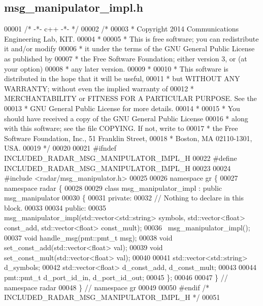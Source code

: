 \subsection{msg\+\_\+manipulator\+\_\+impl.\+h}
\label{msg__manipulator__impl_8h_source}

\begin{DoxyCode}
00001 \textcolor{comment}{/* -*- c++ -*- */}
00002 \textcolor{comment}{/* }
00003 \textcolor{comment}{ * Copyright 2014 Communications Engineering Lab, KIT.}
00004 \textcolor{comment}{ * }
00005 \textcolor{comment}{ * This is free software; you can redistribute it and/or modify}
00006 \textcolor{comment}{ * it under the terms of the GNU General Public License as published by}
00007 \textcolor{comment}{ * the Free Software Foundation; either version 3, or (at your option)}
00008 \textcolor{comment}{ * any later version.}
00009 \textcolor{comment}{ * }
00010 \textcolor{comment}{ * This software is distributed in the hope that it will be useful,}
00011 \textcolor{comment}{ * but WITHOUT ANY WARRANTY; without even the implied warranty of}
00012 \textcolor{comment}{ * MERCHANTABILITY or FITNESS FOR A PARTICULAR PURPOSE.  See the}
00013 \textcolor{comment}{ * GNU General Public License for more details.}
00014 \textcolor{comment}{ * }
00015 \textcolor{comment}{ * You should have received a copy of the GNU General Public License}
00016 \textcolor{comment}{ * along with this software; see the file COPYING.  If not, write to}
00017 \textcolor{comment}{ * the Free Software Foundation, Inc., 51 Franklin Street,}
00018 \textcolor{comment}{ * Boston, MA 02110-1301, USA.}
00019 \textcolor{comment}{ */}
00020 
00021 \textcolor{preprocessor}{#ifndef INCLUDED\_RADAR\_MSG\_MANIPULATOR\_IMPL\_H}
00022 \textcolor{preprocessor}{#define INCLUDED\_RADAR\_MSG\_MANIPULATOR\_IMPL\_H}
00023 
00024 \textcolor{preprocessor}{#include <radar/msg_manipulator.h>}
00025 
00026 \textcolor{keyword}{namespace }gr \{
00027   \textcolor{keyword}{namespace }radar \{
00028 
00029     \textcolor{keyword}{class }msg_manipulator_impl : \textcolor{keyword}{public} msg_manipulator
00030     \{
00031      \textcolor{keyword}{private}:
00032       \textcolor{comment}{// Nothing to declare in this block.}
00033 
00034      \textcolor{keyword}{public}:
00035       msg_manipulator_impl(std::vector<std::string> symbols, std::vector<float> const\_add, 
      std::vector<float> const\_mult);
00036       ~msg_manipulator_impl();
00037       \textcolor{keywordtype}{void} handle_msg(pmt::pmt\_t msg);
00038       \textcolor{keywordtype}{void} set_const_add(std::vector<float> val);
00039       \textcolor{keywordtype}{void} set_const_mult(std::vector<float> val);
00040       
00041       std::vector<std::string> d_symbols;
00042       std::vector<float> d_const_add, d_const_mult;
00043       
00044       pmt::pmt\_t d_port_id_in, d_port_id_out;
00045     \};
00046 
00047   \} \textcolor{comment}{// namespace radar}
00048 \} \textcolor{comment}{// namespace gr}
00049 
00050 \textcolor{preprocessor}{#endif }\textcolor{comment}{/* INCLUDED\_RADAR\_MSG\_MANIPULATOR\_IMPL\_H */}\textcolor{preprocessor}{}
00051 
\end{DoxyCode}
